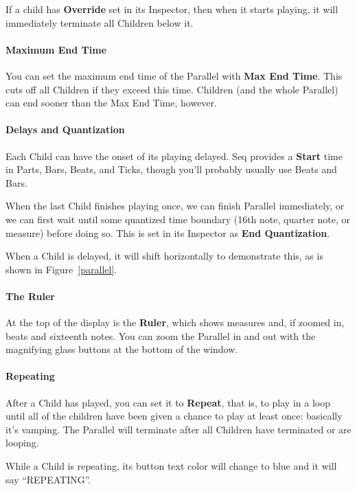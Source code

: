 \documentclass[twoside,10pt]{article}
\begin{document}
If a child has {\bf Override} set in its Inspector, then when it starts playing, it will immediately terminate all Children below it.  

\paragraph{Maximum End Time}

You can set the maximum end time of the Parallel with {\bf Max End Time}.  This cuts off all Children if they exceed this time.  Children (and the whole Parallel) can end sooner than the Max End Time, however.

\paragraph{Delays and Quantization}

Each Child can have the onset of its playing delayed.  Seq provides a {\bf Start} time in Parts, Bars, Beats, and Ticks, though you'll probably usually use Beats and Bars.

When the last Child finishes playing once, we can finish Parallel immediately, or we can first wait until some quantized time boundary (16th note, quarter note, or measure) before doing so.  This is set in its Inspector as {\bf End Quantization}.

When a Child is delayed, it will shift horizontally to demonstrate this, as is shown in Figure~\ref{parallel}.

\paragraph{The Ruler}
At the top of the display is the {\bf Ruler}, which shows measures and, if zoomed in, beats and sixteenth notes. 
You can zoom the Parallel in and out with the magnifying glass buttons at the bottom of the window.


\paragraph{Repeating}

After a Child has played, you can set it to {\bf Repeat}, that is, to play in a loop until all of the children have been given a chance to play at least once: basically it's vamping.  The Parallel will terminate after all Children have terminated or are looping.

While a Child is repeating, its button text color will change to blue and it will say ``REPEATING''.
\end{document}
